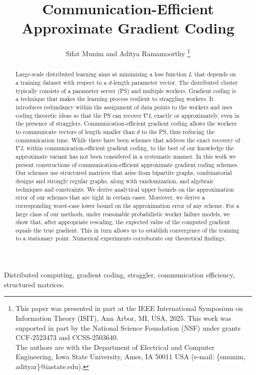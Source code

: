\documentclass[journal,draftcls,onecolumn]{IEEEtran}
\title{Communication-Efficient Approximate Gradient Coding}
\author{Sifat Munim and Aditya Ramamoorthy%
\thanks{This paper was presented in part at the IEEE International Symposium on Information Theory (ISIT), Ann Arbor, MI, USA, 2025. This work was supported in part by the National Science Foundation (NSF) under grants CCF-2523473 and CCSS-2503640.\\
The authors are with the Department of Electrical and Computer Engineering, Iowa State University, Ames, IA 50011 USA (e-mail: \{smunim, adityar\}@iastate.edu).}
}
\theoremstyle{mystyle}
\begin{document}
\maketitle
\begin{abstract}
Large-scale distributed learning aims at minimizing a loss function $L$ that depends on a training dataset with respect to a $d$-length parameter vector. The distributed cluster typically consists of a parameter server (PS) and multiple workers. Gradient coding is a technique that makes the learning process resilient to straggling workers. It introduces redundancy within the assignment of data points to the workers and uses coding theoretic ideas so that the PS can recover $\nabla L$ exactly or approximately, even in the presence of stragglers. Communication-efficient gradient coding allows the workers to communicate vectors of length smaller than $d$ to the PS, thus reducing the communication time. While there have been schemes that address the exact recovery of $\nabla L$ within communication-efficient gradient coding, to the best of our knowledge the approximate variant has not been considered in a systematic manner. In this work we present constructions of communication-efficient approximate gradient coding schemes. Our schemes use structured matrices that arise from bipartite graphs, combinatorial designs and strongly regular graphs, along with randomization, and algebraic techniques and constraints. We derive analytical upper bounds on the approximation error of our schemes that are tight in certain cases. Moreover, we derive a corresponding worst-case lower bound on the approximation error of any scheme. For a large class of our methods, under reasonable probabilistic worker failure models, we show that, after appropriate rescaling, the expected value of the computed gradient equals the true gradient. This in turn allows us to establish convergence of the training to a stationary point. Numerical experiments corroborate our theoretical findings.
\end{abstract}
\begin{IEEEkeywords}
Distributed computing, gradient coding, straggler, communication efficiency, structured matrices. 
\end{IEEEkeywords}
\end{document}
